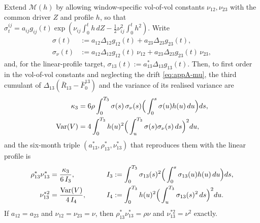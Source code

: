 \documentclass[../../main.tex]{subfiles}
\begin{document}
\begin{proposition}\label{prop:appA-skewcurv}
Extend $\mathcal M(h)$ by allowing window-specific vol-of-vol constants $\nu_{12},\nu_{23}$ with the common driver $Z$ and profile $h$, so that $\sigma^{ij}_t=a_{ij}g_{ij}(t)\exp(\nu_{ij}\int_0^th\,dZ-\tfrac12\nu_{ij}^2\int_0^th^2)$. Write
\begin{align*}
\sigma(t)&:=a_{12}\Delta_{12}g_{12}(t)+a_{23}\Delta_{23}g_{23}(t),\\
\sigma_\nu(t)&:=a_{12}\Delta_{12}g_{12}(t)\,\nu_{12}+a_{23}\Delta_{23}g_{23}(t)\,\nu_{23},
\end{align*}
and, for the linear-profile target, $\sigma_{13}(t):=a_{13}^*\Delta_{13}g_{13}(t)$. Then, to first order in the vol-of-vol constants and neglecting the drift \eqref{eq:appA-mu}, the third cumulant of $\Delta_{13}(\bar R_{13}-\bar F^{13}_0)$ and the variance of its realised variance are
\begin{equation}\label{eq:appA-cumulants}
\begin{aligned}
\kappa_3&=6\rho\int_0^{T_3}\sigma(s)\,\sigma_\nu(s)\Big(\int_0^s\sigma(u)h(u)\,du\Big)ds,\\
\operatorname{Var}(V)&=4\int_0^{T_3}h(u)^2\Big(\int_u^{T_3}\sigma(s)\sigma_\nu(s)\,ds\Big)^2du ,
\end{aligned}
\end{equation}
and the six-month triple $(a_{13}^*,\rho_{13}^*,\nu_{13}^*)$ that reproduces them with the linear profile is
\begin{equation}\label{eq:appA-constraints}
\begin{aligned}
\rho_{13}^*\nu_{13}^*&=\frac{\kappa_3}{6\,I_3},&\qquad I_3&:=\int_0^{T_3}\sigma_{13}(s)^2\Big(\int_0^s\sigma_{13}(u)h(u)\,du\Big)ds,\\
\nu_{13}^{*2}&=\frac{\operatorname{Var}(V)}{4\,I_4},&\qquad I_4&:=\int_0^{T_3}h(u)^2\Big(\int_u^{T_3}\sigma_{13}(s)^2\,ds\Big)^2du .
\end{aligned}
\end{equation}
If $a_{12}=a_{23}$ and $\nu_{12}=\nu_{23}=\nu$, then $\rho_{13}^*\nu_{13}^*=\rho\nu$ and $\nu_{13}^{*2}=\nu^2$ exactly.
\end{proposition}
\end{document}
